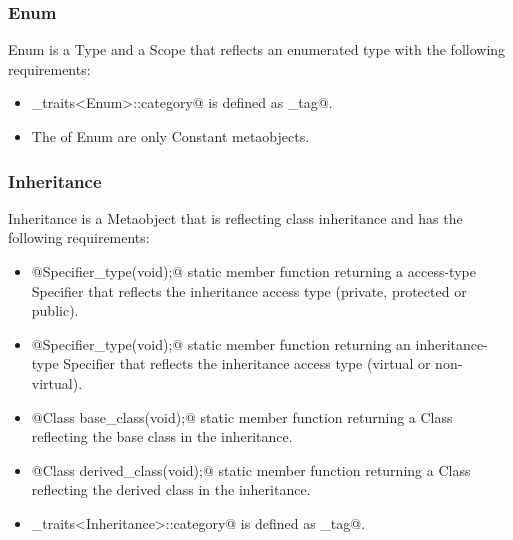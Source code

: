 \subsubsection{Enum}

{\metaobject Enum} is a {\metaobject Type} and a {\metaobject Scope} that reflects an enumerated
type with the following requirements:

\begin{itemize}
	\item \verb@metaobject_traits<Enum>::category@ is defined as \verb@enum_tag@.

	\item The \verb@members@ of {\metaobject Enum} are only {\metaobject Constant} metaobjects.
\end{itemize}

\subsubsection{Inheritance}

{\metaobject Inheritance} is a {\metaobject Metaobject} that is reflecting class inheritance and has
the following requirements:

\begin{itemize}
	\item{\verb@static @{\metaobject Specifier}\verb@access_type(void);@} static member function
	returning a access-type {\metaobject Specifier} that reflects the inheritance access type
	(private, protected or public).

	\item{\verb@static @{\metaobject Specifier}\verb@inheritance_type(void);@} static member function
	returning an inheritance-type {\metaobject Specifier} that reflects the inheritance access type
	(virtual or non-virtual).

	\item{\verb@static @{\metaobject Class} \verb@ base_class(void);@} static member function
	returning a {\metaobject Class} reflecting the base class in the inheritance.

	\item{\verb@static @{\metaobject Class} \verb@ derived_class(void);@} static member function
	returning a {\metaobject Class} reflecting the derived class in the inheritance.

	\item \verb@metaobject_traits<Inheritance>::category@ is defined as \verb@inheritance_tag@.
\end{itemize}


